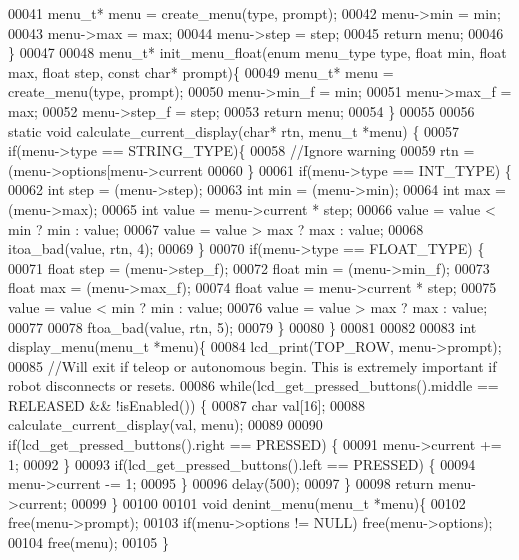 \begin{DoxyCode}
00041   menu_t* menu = create_menu(type, prompt);
00042   menu->min = min;
00043   menu->max = max;
00044   menu->step = step;
00045   \textcolor{keywordflow}{return} menu;
00046 \}
00047 
00048 menu_t* init_menu_float(\textcolor{keyword}{enum} menu_type type, \textcolor{keywordtype}{float} min, \textcolor{keywordtype}{float} max, \textcolor{keywordtype}{float} step, \textcolor{keyword}{const} \textcolor{keywordtype}{char}* prompt)\{
00049   menu_t* menu = create_menu(type, prompt);
00050   menu->min_f = min;
00051   menu->max_f = max;
00052   menu->step_f = step;
00053   \textcolor{keywordflow}{return} menu;
00054 \}
00055 
00056 \textcolor{keyword}{static} \textcolor{keywordtype}{void} calculate_current_display(\textcolor{keywordtype}{char}* rtn, menu_t *menu) \{
00057   \textcolor{keywordflow}{if}(menu->type == STRING_TYPE)\{
00058     \textcolor{comment}{//Ignore warning}
00059     rtn = (menu->options[menu->current %
00060   \}
00061   \textcolor{keywordflow}{if}(menu->type == INT_TYPE) \{
00062     \textcolor{keywordtype}{int} step = (menu->step);
00063     \textcolor{keywordtype}{int} min = (menu->min);
00064     \textcolor{keywordtype}{int} max = (menu->max);
00065     \textcolor{keywordtype}{int} value = menu->current * step;
00066     value = value < min ? min : value;
00067     value = value > max ? max : value;
00068     itoa_bad(value, rtn, 4);
00069   \}
00070   \textcolor{keywordflow}{if}(menu->type == FLOAT_TYPE) \{
00071     \textcolor{keywordtype}{float} step = (menu->step_f);
00072     \textcolor{keywordtype}{float} min = (menu->min_f);
00073     \textcolor{keywordtype}{float} max = (menu->max_f);
00074     \textcolor{keywordtype}{float} value = menu->current * step;
00075     value = value < min ? min : value;
00076     value = value > max ? max : value;
00077 
00078     ftoa_bad(value, rtn, 5);
00079   \}
00080 \}
00081 
00082 
00083 \textcolor{keywordtype}{int} display_menu(menu_t *menu)\{
00084   lcd_print(TOP_ROW, menu->prompt);
00085   \textcolor{comment}{//Will exit if teleop or autonomous begin. This is extremely important if robot disconnects or resets.}
00086   \textcolor{keywordflow}{while}(lcd_get_pressed_buttons().middle == RELEASED && !isEnabled()) \{
00087     \textcolor{keywordtype}{char} val[16];
00088     calculate_current_display(val, menu);
00089 
00090     \textcolor{keywordflow}{if}(lcd_get_pressed_buttons().right == PRESSED) \{
00091       menu->current += 1;
00092     \}
00093     \textcolor{keywordflow}{if}(lcd_get_pressed_buttons().left == PRESSED) \{
00094       menu->current -= 1;
00095     \}
00096     delay(500);
00097   \}
00098   \textcolor{keywordflow}{return} menu->current;
00099 \}
00100 
00101 \textcolor{keywordtype}{void} denint_menu(menu_t *menu)\{
00102   free(menu->prompt);
00103   \textcolor{keywordflow}{if}(menu->options != NULL) free(menu->options);
00104   free(menu);
00105 \}
\end{DoxyCode}
